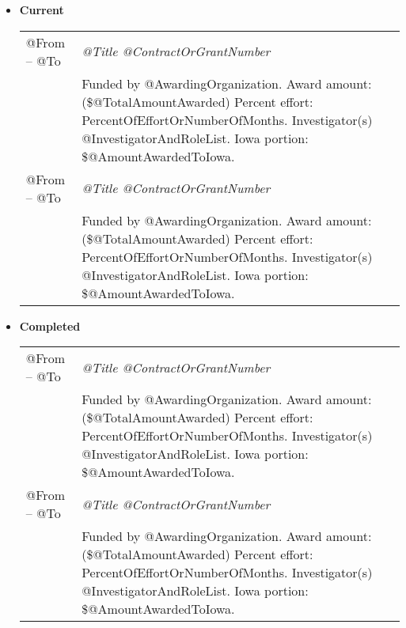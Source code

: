 \documentclass[10pt]{article}
\begin{document}
\begin{itemize}


\item[] \textbf{Current}
\\[1.3ex]
\begin{tabular}{l@{\quad\ }p{34em}} 
 @From -- @To 
 & \emph{@Title @ContractOrGrantNumber} \\
 & Funded by @AwardingOrganization. 
   Award amount: (\$@TotalAmountAwarded) 
   Percent effort: PercentOfEffortOrNumberOfMonths. 
   Investigator(s) @InvestigatorAndRoleList. 
   Iowa portion: \$@AmountAwardedToIowa.
   \smallskip \\
 @From -- @To 
 & \emph{@Title @ContractOrGrantNumber} \\
 & Funded by @AwardingOrganization. 
   Award amount: (\$@TotalAmountAwarded) 
   Percent effort: PercentOfEffortOrNumberOfMonths. 
   Investigator(s) @InvestigatorAndRoleList. 
   Iowa portion: \$@AmountAwardedToIowa.
\end{tabular}

\item[] \textbf{Completed}
\\[1.3ex]
\begin{tabular}{l@{\quad\ }p{34em}} 
 @From -- @To 
 & \emph{@Title @ContractOrGrantNumber} \\
 & Funded by @AwardingOrganization. 
   Award amount: (\$@TotalAmountAwarded) 
   Percent effort: PercentOfEffortOrNumberOfMonths. 
   Investigator(s) @InvestigatorAndRoleList. 
   Iowa portion: \$@AmountAwardedToIowa.
   \smallskip \\
 @From -- @To 
 & \emph{@Title @ContractOrGrantNumber} \\
 & Funded by @AwardingOrganization. 
   Award amount: (\$@TotalAmountAwarded) 
   Percent effort: PercentOfEffortOrNumberOfMonths. 
   Investigator(s) @InvestigatorAndRoleList. 
   Iowa portion: \$@AmountAwardedToIowa.
\end{tabular}


\end{itemize}
\end{document}

